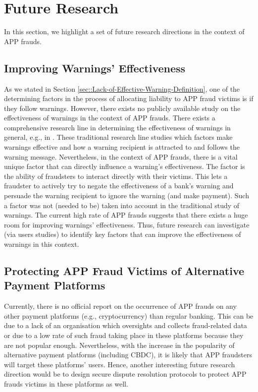 

\section{Future Research}


In this section, we highlight a set of future research directions in the context of APP frauds. 

\subsection{Improving Warnings' Effectiveness}

As we stated in  Section \ref{sec::Lack-of-Effective-Warning-Definition},  one of the determining factors in the process of allocating liability to APP fraud victims is if they follow warnings. However,  there exists no publicly available study on the effectiveness of warnings in  the context of APP frauds. There exists a comprehensive research line in determining the effectiveness of warnings in general, e.g., in \cite{brinton2016users,felt2014experimenting,laughery2006designing}. These traditional research line studies which factors make warnings effective and how a warning recipient is attracted to and follows the warning message. Nevertheless, in the context of APP frauds, there is a vital unique factor that can directly influence a warning's effectiveness. The factor is the ability of  fraudsters to interact directly with their victims. This lets a fraudster to actively try to negate the effectiveness of a bank's warning and persuade the warning recipient to ignore the warning (and make payment). Such a factor was not (needed to be) taken into account in the traditional study of warnings. The current high rate of  APP frauds suggests that there exists a huge room for improving warnings' effectiveness. Thus, future research can investigate (via  users studies) to identify  key factors that can improve the effectiveness of warnings in this context. 





\subsection{Protecting APP Fraud Victims of Alternative Payment Platforms}

Currently, there is no official report on the occurrence of APP frauds on any other payment platforms (e.g., cryptocurrency) than  regular banking. This can be due to a lack of an organisation which oversights and collects fraud-related data or due to a low rate of such fraud taking place in these platforms because they are not popular enough. Nevertheless,  with the increase in the popularity of  alternative payment platforms (including CBDC), it is likely that APP fraudsters will target these platforms' users. Hence, another interesting future research direction would be to design secure dispute resolution protocols  to protect  APP frauds victims in these platforms as well. 

